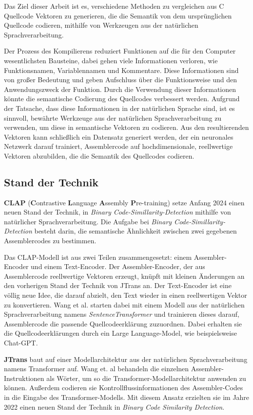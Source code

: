\documentclass[12pt,letterpaper,ngerman]{article}
\begin{document}
Das Ziel dieser Arbeit ist es, verschiedene Methoden zu vergleichen
aus C Quellcode Vektoren zu generieren, die die Semantik von dem ursprünglichen
Quellcode codieren, mithilfe von Werkzeugen aus der natürlichen Sprachverarbeitung.

Der Prozess des Kompilierens reduziert Funktionen
auf die für den Computer wesentlichsten Bausteine, dabei gehen viele 
Informationen verloren, wie Funktionsnamen, Variablennamen und Kommentare. 
Diese Informationen sind von großer Bedeutung und geben Aufschluss über 
die Funktionsweise und den Anwendungszweck der Funktion. Durch die Verwendung 
dieser Informationen könnte die semantische Codierung des Quellcodes verbessert
werden. Aufgrund der Tatsache, dass diese Informationen in der natürlichen 
Sprache sind, ist es sinnvoll, bewährte Werkzeuge aus der natürlichen 
Sprachverarbeitung zu verwenden, um diese in semantische Vektoren zu codieren. 
Aus den resultierenden Vektoren kann schließlich ein Datensatz generiert werden,
der ein neuronales Netzwerk darauf trainiert, Assemblercode auf hochdimensionale,
reellwertige Vektoren abzubilden, die die Semantik des Quellcodes codieren.
\pagebreak
\subsection{Stand der Technik}
{\bf CLAP} ({\bf C}ontrastive {\bf L}anguage {\bf A}ssembly {\bf P}re-training) 
\cite{clap} 
setze Anfang 2024 einen neuen Stand der Technik, in
\textit{Binary Code-Simillarity-Detection}
mithilfe von natürlicher Sprachverarbeitung. Die Aufgabe bei 
\textit{Binary Code-Simillarity-Detection}
besteht darin, die semantische Ähnlichkeit zwischen zwei gegebenen 
Assemblercodes zu bestimmen.

Das CLAP-Modell ist aus zwei Teilen zusammengesetzt: einem Assembler-Encoder 
und einem Text-Encoder. Der Assembler-Encoder, der aus Assemblercode 
reellwertige Vektoren erzeugt, knüpft mit kleinen Änderungen an den vorherigen
Stand der Technik von JTrans an. Der Text-Encoder ist eine völlig neue Idee, 
die darauf abzielt, den Text wieder in einen reellwertigen Vektor zu 
konvertieren. Wang et al. starten dabei mit einem Modell aus der natürlichen 
Sprachverarbeitung namens \textit{SentenceTransformer} und trainieren dieses
darauf, Assemblercode die passende Quellcodeerklärung  zuzuordnen. Dabei 
erhalten sie die Quellcodeerklärungen durch ein Large  Language-Model, wie
beispielsweise Chat-GPT.

{\bf JTrans} \cite{jtrans}
baut auf einer Modellarchitektur aus der natürlichen 
Sprachverarbeitung namens 
Transformer \cite{transformer} auf. 
Wang et. al behandeln die einzelnen Assembler-Instruktionen als Wörter, um so 
die Transformer-Modellarchitektur anwenden zu können. Außerdem codieren sie
Kontrollflussinformationen des Assembler-Codes in die Eingabe des 
Transformer-Modells. Mit diesem Ansatz erzielten sie im Jahre 2022 einen neuen
Stand der Technik in \textit{Binary Code Similarity Detection}.
\end{document}
